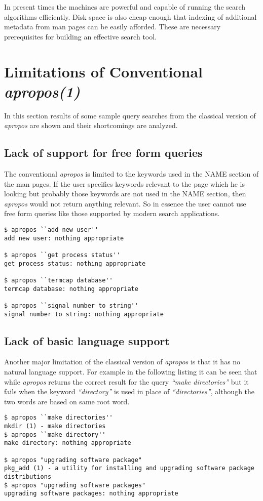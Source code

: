 \documentclass[titlepage, a4paper, 12pt]{article}
\begin{document}
In present times the machines are powerful and  capable of running the search
algorithms efficiently. Disk
space is also cheap enough that indexing of additional metadata from man pages
can be easily afforded. These are necessary prerequisites for building an
effective search tool.

\section{Limitations of Conventional \textit{apropos(1)}}
In this section results of some sample query searches from
the classical version of \textit{apropos} are shown and their shortcomings are
analyzed.

\subsection{Lack of support for free form queries}
The conventional \textit{apropos} is limited to the keywords used in the NAME
section
of the man pages. If the user specifies keywords relevant to the page which he
is looking but probably those keywords are not used in the NAME section,
then \textit{apropos} would not return
anything relevant. So in essence the user cannot use free form queries like
those supported by modern search applications.
\begin{lstlisting}
$ apropos ``add new user''
add new user: nothing appropriate

$ apropos ``get process status''
get process status: nothing appropriate

$ apropos ``termcap database''
termcap database: nothing appropriate

$ apropos ``signal number to string''
signal number to string: nothing appropriate
\end{lstlisting}

\subsection{Lack of basic language support}
Another major limitation of the classical version of \textit{apropos} is that
it has no
natural language support. For example in the following listing it can be seen
that while \textit{apropos} returns the correct result for the query \textit{``make directories''} but it fails when the keyword \textit{``directory''} is
used in place of \textit{``directories''}, although the two words are based on
same root word.
\begin{lstlisting}
$ apropos ``make directories''
mkdir (1) - make directories
$ apropos ``make directory''
make directory: nothing appropriate

$ apropos "upgrading software package"
pkg_add (1) - a utility for installing and upgrading software package
distributions
$ apropos "upgrading software packages"
upgrading software packages: nothing appropriate
\end{lstlisting}
\end{document}
